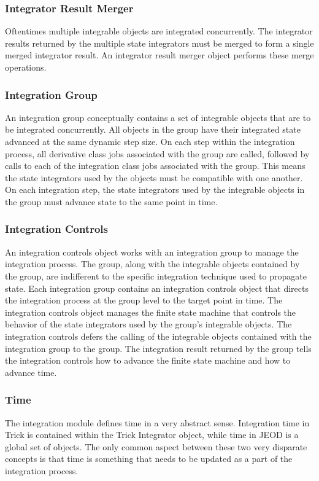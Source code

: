 \subsubsection{Integrator Result Merger}
Oftentimes multiple integrable objects are integrated concurrently.
The integrator results returned by the multiple state integrators must be
merged to form a single merged integrator result. An integrator result merger
object performs these merge operations.

\subsubsection{Integration Group}
An integration group conceptually contains a set of integrable objects that are
to be integrated concurrently. All objects in the group have their integrated
state advanced at the same dynamic step size. On each step within the
integration process, all derivative class jobs associated with the group are
called, followed by calls to each of the integration class jobs associated with
the group.
This means the state integrators used by the objects must be compatible
with one another. On each integration step, the state integrators used by the
integrable objects in the group must advance state to the same point in time.

\subsubsection{Integration Controls}
An integration controls object works with an integration group to manage the
integration process. The group, along with the integrable objects contained by
the group, are indifferent to the specific integration technique used to
propagate state.  Each integration group contains an integration controls object
that directs the integration process at the group level to the target point in
time. The integration controls object manages the finite state machine that
controls the behavior of the state integrators used by the group's integrable
objects. The integration controls defers the calling of the integrable objects
contained with the integration group to the group. The integration result
returned by the group tells the integration controls how to advance the
finite state machine and how to advance time.

\subsubsection{Time}
The \erseven integration module defines time in a very abstract sense.
Integration time in Trick is contained within the Trick Integrator object,
while time in JEOD is a global set of objects. The only common aspect between
these two very disparate concepts is that time is something that needs to be
updated as a part of the integration process.

